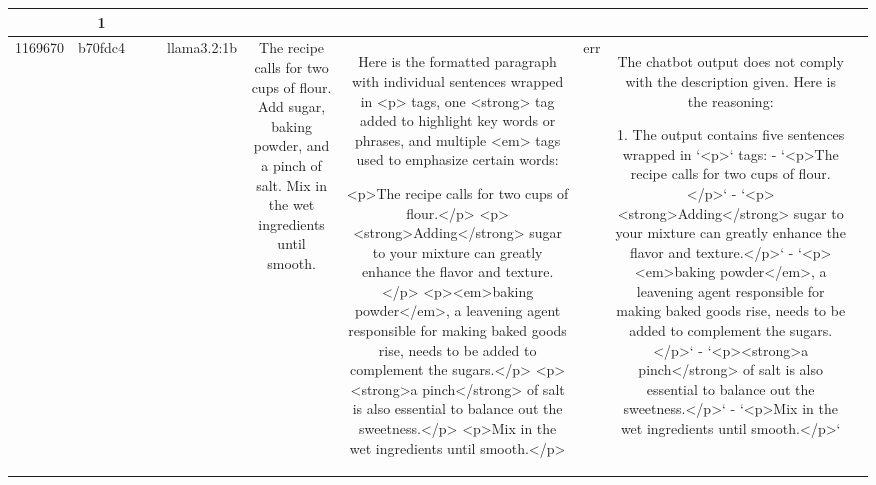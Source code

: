 \begin{table}[h!]
\begin{tabular}{|c|c|c|c|c|c|c|c|c|c|}
{{1. The output contains three `<p>` tags, which satisfies the requirement of having at least three `<p>` tags.
2. Each `<p>` tag contains at least one `<strong>` tag to emphasize certain keywords. Specifically:
   - The first `<p>` tag includes two `<strong>` tags around "For" and "cups."
   - The second `<p>` tag includes two `<strong>` tags around "sugar" and "baking powder."
   - The third `<p>` tag does not contain any `<strong>` tags. This violates the requirement since each sentence should contain a `<strong>` tag.
3. Multiple `<em>` tags are used to emphasize key words and phrases across the sentences. Although the third `<p>` tag does not have `<em>` tags, the requirement for `<em>` tags is that they should be used for key words and phrases, and this is subjective without knowing the input. Therefore, we can't evaluate this aspect fully without the input.

The specific violation here is the absence of a `<strong>` tag in the third `<p>` tag. Based on the description, every sentence should have at least one `<strong>` tag.

ERR & 1\\
\hline
1169670 & b70fdc4 &  &  & llama3.2:1b & The recipe calls for two cups of flour. Add sugar, baking powder, and a pinch of salt. Mix in the wet ingredients until smooth. & Here is the formatted paragraph with individual sentences wrapped in <p> tags, one <strong> tag added to highlight key words or phrases, and multiple <em> tags used to emphasize certain words:

<p>The recipe calls for two cups of flour.</p>
<p><strong>Adding</strong> sugar to your mixture can greatly enhance the flavor and texture.</p>
<p><em>baking powder</em>, a leavening agent responsible for making baked goods rise, needs to be added to complement the sugars.</p>
<p><strong>a pinch</strong> of salt is also essential to balance out the sweetness.</p>
<p>Mix in the wet ingredients until smooth.</p> & err & The chatbot output does not comply with the description given. Here is the reasoning:

1. The output contains five sentences wrapped in `<p>` tags: 
   - `<p>The recipe calls for two cups of flour.</p>`
   - `<p><strong>Adding</strong> sugar to your mixture can greatly enhance the flavor and texture.</p>`
   - `<p><em>baking powder</em>, a leavening agent responsible for making baked goods rise, needs to be added to complement the sugars.</p>`
   - `<p><strong>a pinch</strong> of salt is also essential to balance out the sweetness.</p>`
   - `<p>Mix in the wet ingredients until smooth.</p>`

}}
\end{tabular}
\end{table}
